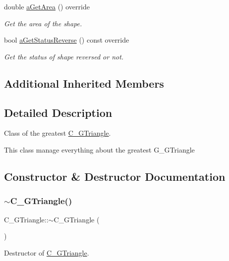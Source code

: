 \begin{DoxyCompactItemize}
double \hyperlink{classC__GTriangle_a4d1c9a050aef86a7eab973b1fe668544}{a\+Get\+Area} () override
\begin{DoxyCompactList}\small\item\em Get the area of the shape. \end{DoxyCompactList}\item 
bool \hyperlink{classC__GTriangle_a8aa6444f3d7f001f61cd3903a46f4b67}{a\+Get\+Status\+Reverse} () const override
\begin{DoxyCompactList}\small\item\em Get the status of shape reversed or not. \end{DoxyCompactList}\end{DoxyCompactItemize}
\subsection*{Additional Inherited Members}


\subsection{Detailed Description}
Class of the greatest \hyperlink{classC__GTriangle}{C\+\_\+\+G\+Triangle}. 

This class manage everything about the greatest G\+\_\+\+G\+Triangle 

\subsection{Constructor \& Destructor Documentation}
\mbox{\label{classC__GTriangle_ad904f86d6bde64caabd005b3bad333e2}} 
\subsubsection{\texorpdfstring{$\sim$\+C\+\_\+\+G\+Triangle()}{~C\_GTriangle()}}
{\footnotesize\ttfamily C\+\_\+\+G\+Triangle\+::$\sim$\+C\+\_\+\+G\+Triangle (\begin{DoxyParamCaption}{ }\end{DoxyParamCaption})\hspace{0.3cm}{\ttfamily [override]}}



Destructor of \hyperlink{classC__GTriangle}{C\+\_\+\+G\+Triangle}. 

